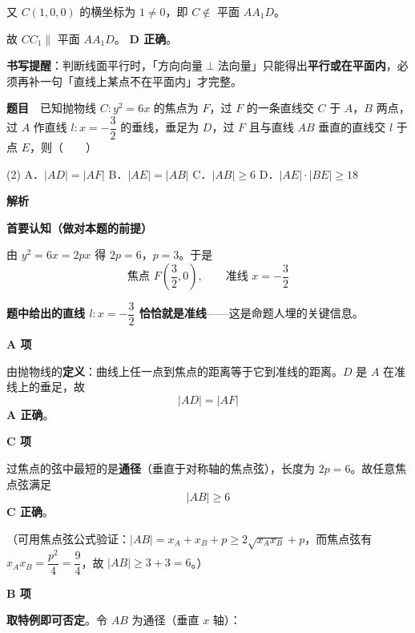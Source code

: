 又 $C(1,0,0)$ 的横坐标为 $1\ne0$，即 $C\notin$ 平面 $AA_1D$。

故 $CC_1\parallel$ 平面 $AA_1D$。 \textbf{D 正确}。


\begin{gktip}
\textbf{书写提醒}：判断线面平行时，「方向向量$\perp$法向量」只能得出\textbf{平行或在平面内}，必须再补一句「直线上某点不在平面内」才完整。
\end{gktip}

\par\medskip


\textbf{题目}　已知抛物线 $C:y^2=6x$ 的焦点为 $F$，过 $F$ 的一条直线交 $C$ 于 $A$，$B$ 两点，过 $A$ 作直线 $l:x=-\dfrac32$ 的垂线，垂足为 $D$，过 $F$ 且与直线 $AB$ 垂直的直线交 $l$ 于点 $E$，则（　　）

\begin{gkopts}(2)
\task A．$|AD|=|AF|$
\task B．$|AE|=|AB|$
\task C．$|AB|\ge6$
\task D．$|AE|\cdot|BE|\ge18$
\end{gkopts}

\textbf{解析}

\textbf{首要认知（做对本题的前提）}

由 $y^2=6x=2px$ 得 $2p=6$，$p=3$。于是
\[\text{焦点 }F\left(\frac32,0\right),\qquad\text{准线 }x=-\frac32\]

\textbf{题中给出的直线 $l:x=-\dfrac32$ 恰恰就是准线}——这是命题人埋的关键信息。

\par\medskip

\textbf{A 项}

由抛物线的\textbf{定义}：曲线上任一点到焦点的距离等于它到准线的距离。$D$ 是 $A$ 在准线上的垂足，故
\[|AD|=|AF|\]
 \textbf{A 正确}。

\par\medskip

\textbf{C 项}

过焦点的弦中最短的是\textbf{通径}（垂直于对称轴的焦点弦），长度为 $2p=6$。故任意焦点弦满足
\[|AB|\ge6\]
 \textbf{C 正确}。

（可用焦点弦公式验证：$|AB|=x_A+x_B+p\ge2\sqrt{x_Ax_B}+p$，而焦点弦有 $x_Ax_B=\dfrac{p^2}{4}=\dfrac94$，故 $|AB|\ge3+3=6$。）

\par\medskip

\textbf{B 项}

\textbf{取特例即可否定}。令 $AB$ 为通径（垂直 $x$ 轴）：

